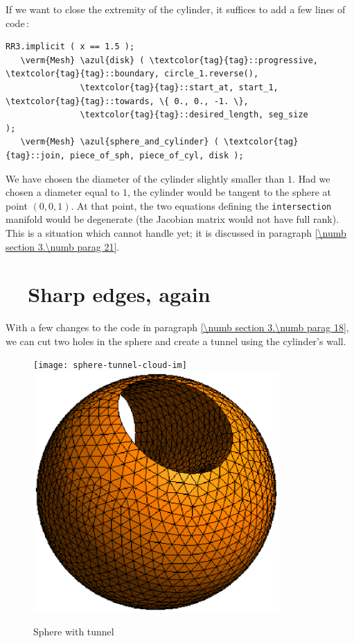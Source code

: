 If we want to close the extremity of the cylinder, it suffices to add a few lines of code$\,$:

\begin{Verbatim}[commandchars=\\\{\},formatcom=\small\tt,
   baselinestretch=0.94,framesep=2mm                     ]
   RR3.implicit ( x == 1.5 );
   \verm{Mesh} \azul{disk} ( \textcolor{tag}{tag}::progressive, \textcolor{tag}{tag}::boundary, circle_1.reverse(),
               \textcolor{tag}{tag}::start_at, start_1, \textcolor{tag}{tag}::towards, \{ 0., 0., -1. \},
               \textcolor{tag}{tag}::desired_length, seg_size                         );
   \verm{Mesh} \azul{sphere_and_cylinder} ( \textcolor{tag}{tag}::join, piece_of_sph, piece_of_cyl, disk );
\end{Verbatim}

We have chosen the diameter of the cylinder slightly smaller than $1$.
Had we chosen a diameter equal to $1$, the cylinder would be tangent to the sphere at point
$ (0,0,1) $.
At that point, the two equations defining the {\small\tt intersection} manifold would be
degenerate (the Jacobian matrix would not have full rank).
This is a situation which {\maniFEM} cannot handle yet; it is discussed in paragraph
\ref{\numb section 3.\numb parag 21}.


\section{~~Sharp edges, again}\label{\numb section 3.\numb parag 19}

With a few changes to the code in paragraph \ref{\numb section 3.\numb parag 18},
we can cut two holes in the sphere and create a tunnel using the cylinder's wall.
\medskip

\begin{figure}[ht] \centering
\if{}
 \texttt{[image: sphere-tunnel-cloud-im]}
\else
 \includegraphics[width=94mm]{sphere-tunnel-low-res}
\fi
  \caption{Sphere with tunnel}
  \label{\numb section 3.\numb fig 7}
\end{figure}

